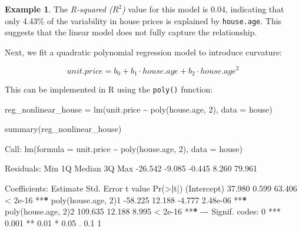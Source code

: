 \documentclass[
  11pt,
]{book}
\makeatletter
\newenvironment{Shaded}{}{}
\newcommand{\AttributeTok}[1]{#1}
\newcommand{\DecValTok}[1]{#1}
\newcommand{\ErrorTok}[1]{\textcolor[rgb]{0.21,0.21,0.21}{\textbf{#1}}}
\newcommand{\FloatTok}[1]{#1}
\newcommand{\FunctionTok}[1]{#1}
\newcommand{\NormalTok}[1]{#1}
\newcommand{\OtherTok}[1]{\textcolor[rgb]{0.39,0.39,0.39}{#1}}
\newcommand{\SpecialCharTok}[1]{\textcolor[rgb]{0.39,0.39,0.39}{#1}}
\newcommand{\StringTok}[1]{\textcolor[rgb]{0.39,0.39,0.39}{#1}}
\newenvironment{kframe}{%
\medskip{}
\setlength{\fboxsep}{.8em}
 \def\at@end@of@kframe{}%
 \ifinner\ifhmode%
  \def\at@end@of@kframe{\end{minipage}}%
  \begin{minipage}{\columnwidth}%
 \fi\fi%
 \def\FrameCommand##1{\hskip\@totalleftmargin \hskip-\fboxsep
 \colorbox{shadecolor}{##1}\hskip-\fboxsep
     \hskip-\linewidth \hskip-\@totalleftmargin \hskip\columnwidth}%
 \MakeFramed {\advance\hsize-\width
   \@totalleftmargin\z@ \linewidth\hsize
   \@setminipage}}%
 {\par\unskip\endMakeFramed%
 \at@end@of@kframe}
\renewenvironment{Shaded}{\begin{kframe}}{\end{kframe}}
\theoremstyle{definition}
\theoremstyle{definition}
\newtheorem{example}{Example}[chapter]
\theoremstyle{definition}
\theoremstyle{definition}
\theoremstyle{remark}
\makeatother
\begin{document}
\begin{example}
The \emph{R-squared (\(R^2\))} value for this model is 0.04, indicating that only 4.43\% of the variability in house prices is explained by \texttt{house.age}. This suggests that the linear model does not fully capture the relationship.

Next, we fit a quadratic polynomial regression model to introduce curvature:

\[
unit.price = b_0 + b_1 \cdot house.age + b_2 \cdot house.age^2
\]

This can be implemented in R using the \texttt{poly()} function:

\begin{Shaded}
\begin{Highlighting}[]
\NormalTok{reg\_nonlinear\_house }\OtherTok{=} \FunctionTok{lm}\NormalTok{(unit.price }\SpecialCharTok{\textasciitilde{}} \FunctionTok{poly}\NormalTok{(house.age, }\DecValTok{2}\NormalTok{), }\AttributeTok{data =}\NormalTok{ house)}

\FunctionTok{summary}\NormalTok{(reg\_nonlinear\_house)}
   
\NormalTok{   Call}\SpecialCharTok{:}
   \FunctionTok{lm}\NormalTok{(}\AttributeTok{formula =}\NormalTok{ unit.price }\SpecialCharTok{\textasciitilde{}} \FunctionTok{poly}\NormalTok{(house.age, }\DecValTok{2}\NormalTok{), }\AttributeTok{data =}\NormalTok{ house)}
   
\NormalTok{   Residuals}\SpecialCharTok{:}
\NormalTok{       Min      }\DecValTok{1}\NormalTok{Q  Median      }\DecValTok{3}\NormalTok{Q     Max }
   \SpecialCharTok{{-}}\FloatTok{26.542}  \SpecialCharTok{{-}}\FloatTok{9.085}  \SpecialCharTok{{-}}\FloatTok{0.445}   \FloatTok{8.260}  \FloatTok{79.961} 
   
\NormalTok{   Coefficients}\SpecialCharTok{:}
\NormalTok{                       Estimate Std. Error t value }\FunctionTok{Pr}\NormalTok{(}\SpecialCharTok{\textgreater{}}\ErrorTok{|}\NormalTok{t}\SpecialCharTok{|}\NormalTok{)    }
\NormalTok{   (Intercept)           }\FloatTok{37.980}      \FloatTok{0.599}  \FloatTok{63.406}  \SpecialCharTok{\textless{}} \FloatTok{2e{-}16} \SpecialCharTok{**}\ErrorTok{*}
   \FunctionTok{poly}\NormalTok{(house.age, }\DecValTok{2}\NormalTok{)}\DecValTok{1}  \SpecialCharTok{{-}}\FloatTok{58.225}     \FloatTok{12.188}  \SpecialCharTok{{-}}\FloatTok{4.777} \FloatTok{2.48e{-}06} \SpecialCharTok{**}\ErrorTok{*}
   \FunctionTok{poly}\NormalTok{(house.age, }\DecValTok{2}\NormalTok{)}\DecValTok{2}  \FloatTok{109.635}     \FloatTok{12.188}   \FloatTok{8.995}  \SpecialCharTok{\textless{}} \FloatTok{2e{-}16} \SpecialCharTok{**}\ErrorTok{*}
   \SpecialCharTok{{-}{-}{-}}
\NormalTok{   Signif. codes}\SpecialCharTok{:}  \DecValTok{0} \StringTok{\textquotesingle{}***\textquotesingle{}} \FloatTok{0.001} \StringTok{\textquotesingle{}**\textquotesingle{}} \FloatTok{0.01} \StringTok{\textquotesingle{}*\textquotesingle{}} \FloatTok{0.05} \StringTok{\textquotesingle{}.\textquotesingle{}} \FloatTok{0.1} \StringTok{\textquotesingle{} \textquotesingle{}} \DecValTok{1}
   

\end{Highlighting}
\end{Shaded}
\end{example}
\end{document}
